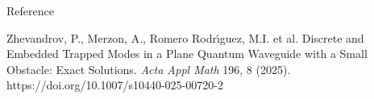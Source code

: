 \documentclass{beamer}
\begin{document}
\begin{frame}{Reference}

Zhevandrov, P., Merzon, A., Romero Rodr\'\i guez, M.I. et al. Discrete and Embedded Trapped Modes in a Plane Quantum Waveguide with a Small Obstacle: Exact Solutions. {\it Acta Appl Math} 196, 8 (2025). https://doi.org/10.1007/s10440-025-00720-2


















\end{frame}
\end{document}
